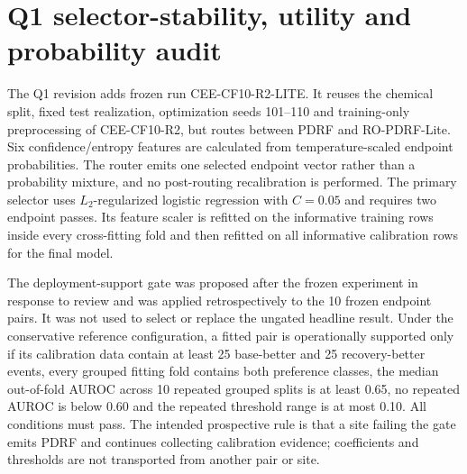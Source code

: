 \documentclass[10pt]{article}
\begin{document}
\begin{table}[ht]
\centering
\caption{Parameter count and measured CPU cost on the chemical-array run. Training times include early stopping and therefore vary with selected epoch. Inference excludes data loading.}
\resizebox{0.82\textwidth}{!}{}
\end{table}

\section{Q1 selector-stability, utility and probability audit}

The Q1 revision adds frozen run CEE-CF10-R2-LITE. It reuses the chemical split, fixed test realization, optimization seeds 101--110 and training-only preprocessing of CEE-CF10-R2, but routes between PDRF and RO-PDRF-Lite. Six confidence/entropy features are calculated from temperature-scaled endpoint probabilities. The router emits one selected endpoint vector rather than a probability mixture, and no post-routing recalibration is performed. The primary selector uses $L_2$-regularized logistic regression with $C=0.05$ and requires two endpoint passes. Its feature scaler is refitted on the informative training rows inside every cross-fitting fold and then refitted on all informative calibration rows for the final model.

\begin{table}[ht]
\centering
\caption{Result-to-run manifest for the Q1 revision. Every listed file is stored under \texttt{source\_data/}; producing scripts and fixed configuration files accompany the submission.}
\label{tab:supp-q1-manifest}
\resizebox{\textwidth}{!}{}
\end{table}

The deployment-support gate was proposed after the frozen experiment in response to review and was applied retrospectively to the 10 frozen endpoint pairs. It was not used to select or replace the ungated headline result. Under the conservative reference configuration, a fitted pair is operationally supported only if its calibration data contain at least 25 base-better and 25 recovery-better events, every grouped fitting fold contains both preference classes, the median out-of-fold AUROC across 10 repeated grouped splits is at least 0.65, no repeated AUROC is below 0.60 and the repeated threshold range is at most 0.10. All conditions must pass. The intended prospective rule is that a site failing the gate emits PDRF and continues collecting calibration evidence; coefficients and thresholds are not transported from another pair or site.
\end{document}
